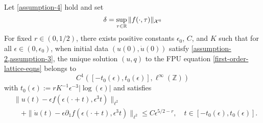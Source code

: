 \begin{theorem}
	Let \cref{assumption-4} hold and set 
	\begin{equation}
		\delta =\sup_{\tau\in\mathbb{R}}\|f(\cdot,\tau)\|_{\mathcal{X}^6}
	\end{equation}
	For fixed \(r\in(0,1/2)\), there exists positive constants \(\epsilon_0\), \(C\), and \(K\) such that for all \(\epsilon \in(0,\epsilon_0)\), when initial data \((u(0), \dot u(0))\) satisfy \cref{assumption-2,assumption-3}, the unique solution \((u,q)\) to the FPU equation \cref{first-order-lattice-eqns} belongs to 
	\begin{equation}
		C^1([-t_0(\epsilon), t_0(\epsilon)], \ell^\infty(\mathbb Z))
	\end{equation}
	with \(t_0(\epsilon):= r K^{-1} \epsilon^{-3} | \log (\epsilon) | \) and satisfies
	\begin{equation}
	\begin{aligned}
		&\| u(t) - \epsilon f(\epsilon(\cdot+t), \epsilon^3 t) \|_{\ell^2} \\
		&\quad + \| \dot u(t) - \epsilon \partial_1 f(\epsilon (\cdot +t),\epsilon^3t)  \|_{\ell^2} \leq C \epsilon^{5/2 - r}, \quad t\in[-t_0(\epsilon), t_0(\epsilon)].
	\end{aligned}
	\end{equation}
\end{theorem}

